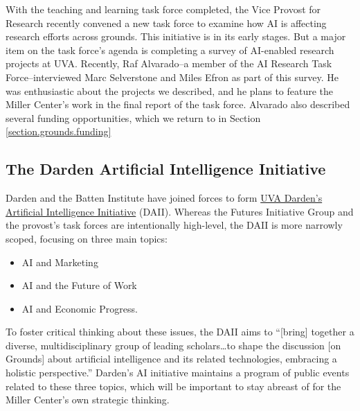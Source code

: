 \documentclass[12pt, oneside]{article}   	%
\begin{document}
With the teaching and learning task force completed, the Vice Provost for Research recently convened a new task force to examine how AI is affecting research efforts across grounds.  This initiative is in its early stages.  But a major item on the task force's agenda is completing a survey of AI-enabled research projects at UVA.  Recently, Raf Alvarado--a member of the AI Research Task Force--interviewed Marc Selverstone and Miles Efron as part of this survey.  He was enthusiastic about the projects we described, and he plans to feature the Miller Center's work in the final report of the task force.  Alvarado also described several funding opportunities, which we return to in Section \ref{section.grounds.funding}

\subsection{The Darden Artificial Intelligence Initiative}
Darden and the Batten Institute have joined forces to form \href{https://www.darden.virginia.edu/intelligence}{UVA Darden’s Artificial Intelligence Initiative} (DAII).  Whereas the Futures Initiative Group and the provost's task forces are intentionally high-level, the DAII is more narrowly scoped, focusing on three main topics:
\begin{itemize}
\item AI and Marketing
\item AI and the Future of Work
\item AI and Economic Progress.
\end{itemize}
To foster critical thinking about these issues, the DAII aims to “[bring] together a diverse, multidisciplinary group of leading scholars…to shape the discussion [on Grounds] about artificial intelligence and its related technologies, embracing a holistic perspective.”  Darden’s AI initiative maintains a program of public events related to these three topics, which will be important to stay abreast of for the Miller Center’s own strategic thinking.
\end{document}
